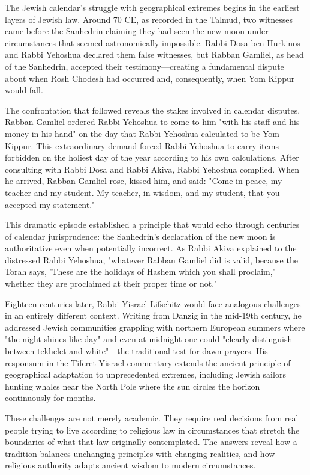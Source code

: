 The Jewish calendar's struggle with geographical extremes begins in the earliest layers of Jewish law. Around 70 CE, as recorded in the Talmud, two witnesses came before the Sanhedrin claiming they had seen the new moon under circumstances that seemed astronomically impossible. Rabbi Dosa ben Hurkinos and Rabbi Yehoshua declared them false witnesses, but Rabban Gamliel, as head of the Sanhedrin, accepted their testimony—creating a fundamental dispute about when Rosh Chodesh had occurred and, consequently, when Yom Kippur would fall.

The confrontation that followed reveals the stakes involved in calendar disputes. Rabban Gamliel ordered Rabbi Yehoshua to come to him "with his staff and his money in his hand" on the day that Rabbi Yehoshua calculated to be Yom Kippur. This extraordinary demand forced Rabbi Yehoshua to carry items forbidden on the holiest day of the year according to his own calculations. After consulting with Rabbi Dosa and Rabbi Akiva, Rabbi Yehoshua complied. When he arrived, Rabban Gamliel rose, kissed him, and said: "Come in peace, my teacher and my student. My teacher, in wisdom, and my student, that you accepted my statement."

This dramatic episode established a principle that would echo through centuries of calendar jurisprudence: the Sanhedrin's declaration of the new moon is authoritative even when potentially incorrect. As Rabbi Akiva explained to the distressed Rabbi Yehoshua, "whatever Rabban Gamliel did is valid, because the Torah says, 'These are the holidays of Hashem which you shall proclaim,' whether they are proclaimed at their proper time or not."

Eighteen centuries later, Rabbi Yisrael Lifschitz would face analogous challenges in an entirely different context. Writing from Danzig in the mid-19th century, he addressed Jewish communities grappling with northern European summers where "the night shines like day" and even at midnight one could "clearly distinguish between tekhelet and white"—the traditional test for dawn prayers. His responsum in the Tiferet Yisrael commentary extends the ancient principle of geographical adaptation to unprecedented extremes, including Jewish sailors hunting whales near the North Pole where the sun circles the horizon continuously for months.

These challenges are not merely academic. They require real decisions from real people trying to live according to religious law in circumstances that stretch the boundaries of what that law originally contemplated. The answers reveal how a tradition balances unchanging principles with changing realities, and how religious authority adapts ancient wisdom to modern circumstances.

